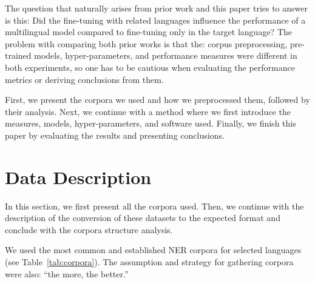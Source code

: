 \documentclass[sigconf]{acmart}
\begin{document}
The question that naturally arises from prior work and this paper tries to answer is this: Did the fine-tuning with related languages influence the performance of a multilingual model compared to fine-tuning only in the target language?
The problem with comparing both prior works is that the: corpus preprocessing, pre-trained models, hyper-parameters, and performance measures were different in both experiments, so one has to be cautious when evaluating the performance metrics or deriving conclusions from them.

First, we present the corpora we used and how we preprocessed them, followed by their analysis.
Next, we continue with a method where we first introduce the measures, models, hyper-parameters, and software used.
Finally, we finish this paper by evaluating the results and presenting conclusions.

\section{Data Description}
\label{sec:data-description}
In this section, we first present all the corpora used. Then, we continue with the description of the conversion of these datasets to the expected format and conclude with the corpora structure analysis.

We used the most common and established NER corpora for selected languages (see Table~\ref{tab:corpora}).
The assumption and strategy for gathering corpora were also: ``the more, the better.''

\end{document}
